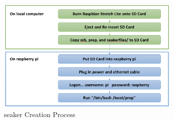 \documentclass[12pt]{article}
\begin{document}
  \begin{figure}[ht]
    \centering
      \includegraphics[width=0.8\textwidth]{images/SeakerCreation.png}
    \caption{\gls{seaker} Creation Process}\label{fig:SeakerCreation}
  \end{figure}

\newpage
\end{document}
